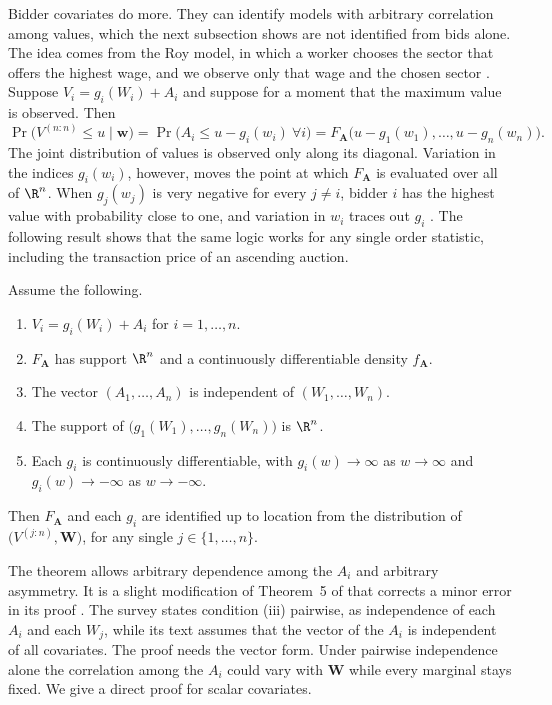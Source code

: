 Bidder covariates do more. They can identify models with arbitrary correlation among values, which the next
subsection shows are not identified from bids alone. The idea comes from the Roy model, in which a worker chooses
the sector that offers the highest wage, and we observe only that wage and the chosen sector
\citep[footnote~29]{AtheyHaile2002}. Suppose $V_i=g_i(W_i)+A_i$ and suppose for a moment that the maximum value is
observed. Then
\[
\Pr\big(V^{(n:n)}\le u\mid\bm w\big)=\Pr\big(A_i\le u-g_i(w_i)\ \forall i\big)=F_{\bm A}\big(u-g_1(w_1),\dots,u-g_n(w_n)\big).
\]
The joint distribution of values is observed only along its diagonal. Variation in the indices $g_i(w_i)$, however,
moves the point at which $F_{\bm A}$ is evaluated over all of $\R^n$. When $g_j(w_j)$ is very negative for every
$j\neq i$, bidder $i$ has the highest value with probability close to one, and variation in $w_i$ traces out
$g_i$ \citep[Section~6.2.1]{AtheyHaile2007}. The following result shows that the same logic works for any single
order statistic, including the transaction price of an ascending auction.

\begin{theorem}\label{thm:15-ah5}
Assume the following.
\begin{enumerate}[label=(\roman*)]
\item $V_i=g_i(W_i)+A_i$ for $i=1,\dots,n$.
\item $F_{\bm A}$ has support $\R^n$ and a continuously differentiable density $f_{\bm A}$.
\item The vector $(A_1,\dots,A_n)$ is independent of $(W_1,\dots,W_n)$.
\item The support of $\big(g_1(W_1),\dots,g_n(W_n)\big)$ is $\R^n$.
\item Each $g_i$ is continuously differentiable, with $g_i(w)\to\infty$ as $w\to\infty$ and $g_i(w)\to-\infty$ as
$w\to-\infty$.
\end{enumerate}
Then $F_{\bm A}$ and each $g_i$ are identified up to location from the distribution of $\big(V^{(j:n)},\bm W\big)$, for
any single $j\in\{1,\dots,n\}$.
\end{theorem}

The theorem allows arbitrary dependence among the $A_i$ and arbitrary asymmetry. It is a slight modification of
Theorem~5 of \citet{AtheyHaile2002} that corrects a minor error in its proof \citep[footnote~55]{AtheyHaile2007}. The
survey states condition (iii) pairwise, as independence of each $A_i$ and each $W_j$, while its text assumes that
the vector of the $A_i$ is independent of all covariates. The proof needs the vector form. Under pairwise
independence alone the correlation among the $A_i$ could vary with $\bm W$ while every marginal stays fixed. We
give a direct proof for scalar covariates.


